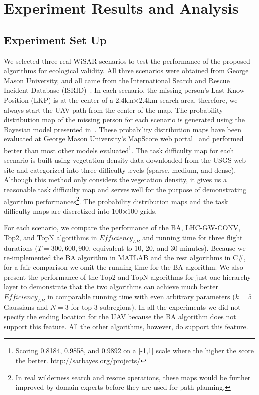 \section{Experiment Results and Analysis}
\label{sec:ExperimentResultsAndAnalysis}

\subsection{Experiment Set Up}

We selected three real WiSAR scenarios to test the performance of the proposed algorithms for ecological validity. All three scenarios were obtained from George Mason University, and all came from the International Search and Rescue Incident Database (ISRID)~\cite{Koester2008Lost}. In each scenario, the missing person's Last Know Position (LKP) is at the center of a 2.4km$\times$2.4km search area, therefore, we always start the UAV path from the center of the map. The probability distribution map of the missing person for each scenario is generated using the Bayesian model presented in~\cite{Lin2010Bayesian}. These probability distribution maps have been evaluated at George Mason University's MapScore web portal~\cite{Twardy2012MapScore} and performed better than most other models evaluated\footnote{Scoring 0.8184, 0.9858, and 0.9892 on a [-1,1] scale where the higher the score the better. http://sarbayes.org/projects/}. The task difficulty map for each scenario is built using vegetation density data downloaded from the USGS web site and categorized into three difficulty levels (sparse, medium, and dense). Although this method only considers the vegetation density, it gives us a reasonable task difficulty map and serves well for the purpose of demonstrating algorithm performances\footnote{In real wilderness search and rescue operations, these maps would be further improved by domain experts before they are used for path planning.}. The probability distribution maps and the task difficulty maps are discretized into 100$\times$100 grids. 

For each scenario, we compare the performance of the BA, LHC-GW-CONV, Top2, and TopN algorithms in $\mathit{Efficiency_{LB}}$ and running time for three flight durations ($T=300,600,900$, equivalent to 10, 20, and 30 minutes). Because we re-implemented the BA algorithm in MATLAB and the rest algorithms in C\#, for a fair comparison we omit the running time for the BA algorithm. We also present the performance of the Top2 and TopN algorithms for just one hierarchy layer to demonstrate that the two algorithms can achieve much better $\mathit{Efficiency_{LB}}$ in comparable running time with even arbitrary parameters ($k=5$ Gaussians and $N=3$ for top 3 subregions). In all the experiments we did not specify the ending location for the UAV because the BA algorithm does not support this feature. All the other algorithms, however, do support this feature.

